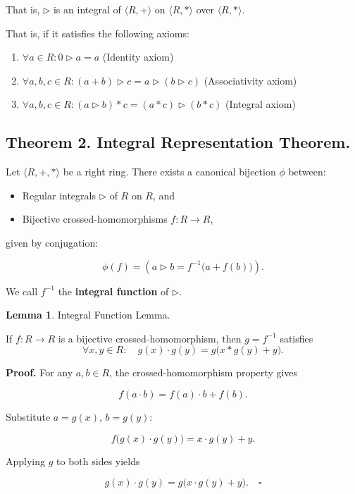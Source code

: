 \documentclass[12pt]{article}
\theoremstyle{definition}
\newtheorem{lemma}[definition]{Lemma}
\begin{document}
That is, $\triangleright$ is an integral of $\langle R, + \rangle$ on $\langle R, * \rangle$ over $\langle R, * \rangle$. 

That is, if it satisfies the following axioms:

\begin{enumerate}
\item $\forall a \in R: 0 \triangleright a = a $ \hfill (Identity axiom)
\item $\forall a, b, c \in R: (a + b) \triangleright c = a \triangleright (b \triangleright c) $ \hfill (Associativity axiom)
\item $\forall a, b, c \in R: (a \triangleright b) * c = (a * c) \triangleright (b * c) $ \hfill (Integral axiom)
\end{enumerate}

\subsection{Theorem 2. Integral Representation Theorem.} 

Let $\langle R, +, * \rangle$ be a right ring. There exists a canonical bijection $\phi$ between:

\begin{itemize}
\item Regular integrals $\triangleright$ of $R$ on $R$, and  
\item Bijective crossed-homomorphisms $f \colon R \to R$,
\end{itemize}

\noindent given by conjugation:  

\[
\phi(f) = \left( a \triangleright b = f^{-1}\big(a + f(b)\big) \right).
\]

We call $f^{-1}$ the \textbf{integral function} of $\triangleright$.

\vspace{10pt}
\begin{lemma} Integral Function Lemma.  

\vspace{5pt}
\noindent If $f \colon R \to R$ is a bijective crossed-homomorphism, then $g = f^{-1}$ satisfies  
\[
\forall x, y \in R: \quad g(x) \cdot g(y) = g\big(x * g(y) + y\big).
\]

\noindent \textbf{Proof.}  For any $a, b \in R$, the crossed-homomorphism property gives  

\[
f(a \cdot b) = f(a) \cdot b + f(b).
\]  

\noindent Substitute $a = g(x)$, $b = g(y)$:  

\[
f\big(g(x) \cdot g(y)\big) = x \cdot g(y) + y.
\]  

\noindent Applying $g$ to both sides yields  

\[
g(x) \cdot g(y) = g\big(x \cdot g(y) + y\big). \quad \square
\]
\end{lemma}
\end{document}
